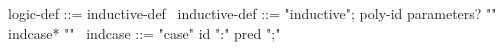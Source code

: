 \begin{syntax}
  logic-def ::= inductive-def
  \
  inductive-def ::= "inductive";
  poly-id parameters? "{" indcase* "}"
  \
  indcase ::= "case" id ":" pred ";"
\end{syntax}